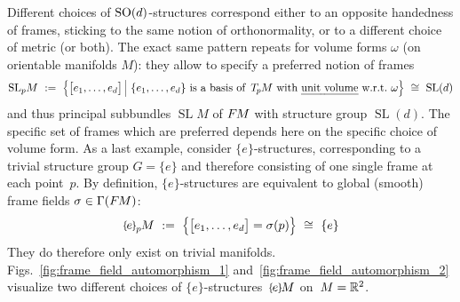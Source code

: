 Different choices of $\operatorname{SO}(d)$-structures correspond either to an opposite handedness of frames, sticking to the same notion of orthonormality, or to a different choice of metric (or both).
The exact same pattern repeats for volume forms $\omega$ (on orientable manifolds $M$):
they allow to specify a preferred notion of frames
\begin{align}
    \operatorname{SL}_p\!M\ :=\ \pig\{ \big[e_{1},\dots,e_{d}\big]\, \pig|\ \{e_{1},\dots,e_{d}\}\ \text{is a basis of }\, \TpM\ \text{with \emph{unit volume} w.r.t.}\ \omega \pig\}\ \cong\ \operatorname{SL}(d)
\end{align}
and thus principal subbundles $\operatorname{SL}\!M$ of $F\mkern-1.5muM$ with structure group $\operatorname{SL}(d)$.
The specific set of frames which are preferred depends here on the specific choice of volume form.
As a last example, consider $\{e\}$-structures, corresponding to a trivial structure group $G=\{e\}$ and therefore consisting of one single frame at each point~$p$.
By definition, $\{e\}$-structures are equivalent to global (smooth) frame fields $\sigma \in \Gamma(F\mkern-1.5muM)$:
\begin{align}
    \epM\ :=\ \pig\{ \big[e_{1},\dots,e_{d}\big] = \sigma(p) \pig\}\ \cong\ \{e\}
\end{align}
They do therefore only exist on trivial manifolds.
Figs.~\ref{fig:frame_field_automorphism_1} and~\ref{fig:frame_field_automorphism_2} visualize two different choices of $\{e\}$-structures~$\eM$ on~$M=\mathbb{R}^2$.


